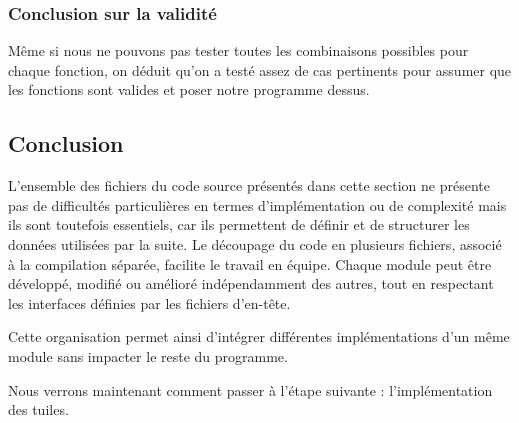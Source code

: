 \subsubsection{Conclusion sur la validité}
Même si nous ne pouvons pas tester toutes les combinaisons possibles pour chaque fonction, on déduit qu'on a testé assez de cas pertinents pour assumer que les fonctions sont valides et poser notre programme dessus.

\subsection{Conclusion}

L’ensemble des fichiers du code source présentés dans cette section ne présente pas de difficultés particulières en termes d’implémentation ou de complexité mais ils sont toutefois essentiels, car ils permettent de définir et de structurer les données utilisées par la suite.
Le découpage du code en plusieurs fichiers, associé à la compilation séparée, facilite le travail en équipe. Chaque module peut être développé, modifié ou amélioré indépendamment des autres, tout en respectant les interfaces définies par les fichiers d’en-tête.

Cette organisation permet ainsi d’intégrer différentes implémentations d’un même module sans impacter le reste du programme.

Nous verrons maintenant comment passer à l'étape suivante : l'implémentation des tuiles.
